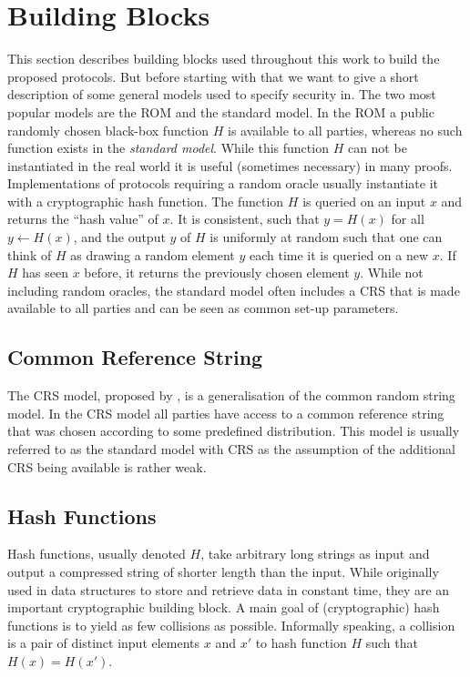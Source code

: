\section{Building Blocks}
This section describes building blocks used throughout this work to build the proposed protocols.
But before starting with that we want to give a short description of some general models used to specify security in.
The two most popular models are the \ac{ROM} and the standard model.
In the \ac{ROM} a public randomly chosen black-box function $H$ is available to all parties, whereas no such function exists in the \emph{standard model}.
While this function $H$ can not be instantiated in the real world it is useful (sometimes necessary) in many proofs.
Implementations of protocols requiring a random oracle usually instantiate it with a cryptographic hash function.
The function $H$ is queried on an input $x$ and returns the ``hash value'' of $x$.
It is consistent, such that $y=H(x)$ for all $y\gets H(x)$, and the output $y$ of $H$ is uniformly at random such that one can think of $H$ as drawing a random element $y$ each time it is queried on a new $x$.
If $H$ has seen $x$ before, it returns the previously chosen element $y$.
While not including random oracles, the standard model often includes a \ac{CRS} that is made available to all parties and can be seen as common set-up parameters.

\subsection{Common Reference String}
The \acl{CRS} model, proposed by \citet{CanettiF01}, is a generalisation of the common random string model.
In the \ac{CRS} model all parties have access to a common reference string that was chosen according to some predefined distribution.
This model is usually referred to as the standard model with \ac{CRS} as the assumption of the additional \ac{CRS} being available is rather weak.

\subsection{Hash Functions}
Hash functions, usually denoted $H$, take arbitrary long strings as input and output a compressed string of shorter length than the input.
While originally used in data structures to store and retrieve data in constant time, they are an important cryptographic building block.
A main goal of (cryptographic) hash functions is to yield as few collisions as possible.
Informally speaking, a collision is a pair of distinct input elements $x$ and $x'$ to hash function $H$ such that $H(x)=H(x')$.

